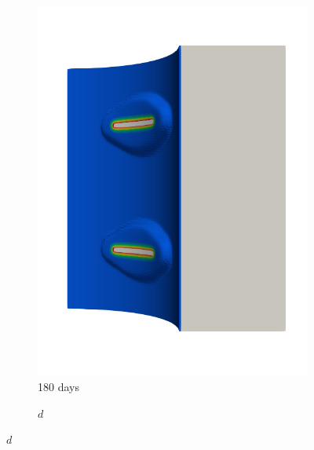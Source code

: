 \begin{figure}[!htb]
\begin{subfigure}[b]{0.2\textwidth}
    \includegraphics[width=\textwidth]{Chapter5/figures/spallation/seed_d_4}
    \caption{180 days}
  \end{subfigure}
  \begin{subfigure}[b]{0.1\textwidth}
    \centering
    \caption*{$d$}

\end{subfigure}
\end{figure}
